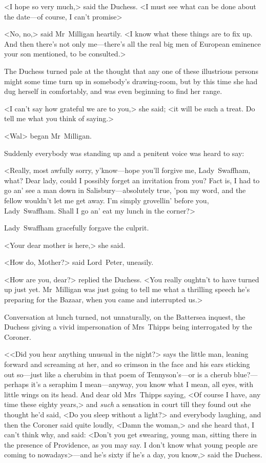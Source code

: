 <I hope so very much,> said the Duchess. <I must see what can be done about the date—of course, I can't promise\longdash>

<No, no,> said Mr~Milligan heartily. <I know what these things are to fix up. And then there's not only me—there's all the real big men of European eminence your son mentioned, to be consulted.>

The Duchess turned pale at the thought that any one of these illustrious persons might some time turn up in somebody's drawing-room, but by this time she had dug herself in comfortably, and was even beginning to find her range.

<I can't say how grateful we are to you,> she said; <it will be such a treat. Do tell me what you think of saying.>

<Wal\longdash> began Mr~Milligan.

Suddenly everybody was standing up and a penitent voice was heard to say:

<Really, most awfully sorry, y'know—hope you'll forgive me, Lady~Swaffham, what? Dear lady, could I possibly forget an invitation from you? Fact is, I had to go an' see a man down in Salisbury—absolutely true, 'pon my word, and the fellow wouldn't let me get away. I'm simply grovellin' before you, Lady~Swaffham. Shall I go an' eat my lunch in the corner?>

Lady~Swaffham gracefully forgave the culprit.

<Your dear mother is here,> she said.

<How do, Mother?> said Lord~Peter, uneasily.

<How are you, dear?> replied the Duchess. <You really oughtn't to have turned up just yet. Mr~Milligan was just going to tell me what a thrilling speech he's preparing for the Bazaar, when you came and interrupted us.>

Conversation at lunch turned, not unnaturally, on the Battersea inquest, the Duchess giving a vivid impersonation of Mrs~Thipps being interrogated by the Coroner.

<<Did you hear anything unusual in the night?> says the little man, leaning forward and screaming at her, and so crimson in the face and his ears sticking out so—just like a cherubim in that poem of Tennyson's—or is a cherub blue?—perhaps it's a seraphim I mean—anyway, you know what I mean, all eyes, with little wings on its head. And dear old Mrs~Thipps saying, <Of course I have, any time these eighty years,> and \emph{such} a sensation in court till they found out she thought he'd said, <Do you sleep without a light?> and everybody laughing, and then the Coroner said quite loudly, <Damn the woman,> and she heard that, I can't think why, and said: <Don't you get swearing, young man, sitting there in the presence of Providence, as you may say. I don't know what young people are coming to nowadays>—and he's sixty if he's a day, you know,> said the Duchess.

